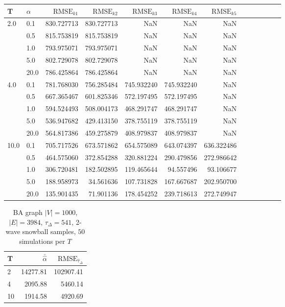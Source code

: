 \documentclass{article}
\begin{document}
\begin{table}[h]
\begin{tabular}{llrrrrrrrrrrr}
\toprule
  T   &  $\alpha$    &     $\text{RMSE}_{k1}$ &     $\text{RMSE}_{k2}$ &     $\text{RMSE}_{k3}$ &     $\text{RMSE}_{k4}$ &     $\text{RMSE}_{k5}$ \\
\midrule
2.0  & 0.1 &  830.727713 &  830.727713 &         NaN &         NaN &         NaN \\
     & 0.5 &  815.753819 &  815.753819 &         NaN &         NaN &         NaN \\
     & 1.0  &  793.975071 &  793.975071 &         NaN &         NaN &         NaN \\
     & 5.0 &  802.729078 &  802.729078 &         NaN &         NaN &         NaN \\
     & 20.0 &  786.425864 &  786.425864 &         NaN &         NaN &         NaN \\
4.0  & 0.1  &  781.768030 &  756.285484 &  745.932240 &  745.932240 &         NaN \\
     & 0.5  &  667.365467 &  601.825346 &  572.197495 &  572.197495 &         NaN \\
     & 1.0  &  594.524493 &  508.004173 &  468.291747 &  468.291747 &         NaN \\
     & 5.0  &  536.947682 &  429.413150 &  378.755119 &  378.755119 &         NaN \\
     & 20.0 &  564.817386 &  459.275879 &  408.979837 &  408.979837 &         NaN \\
10.0 & 0.1  &  705.717526 &  673.571862 &  654.575089 &  643.074397 &  636.322486 \\
     & 0.5  &  464.575060 &  372.854288 &  320.881224 &  290.479856 &  272.986642 \\
     & 1.0  &  306.720481 &  182.502895 &  119.465644 &   94.557496 &   93.106677 \\
     & 5.0  &  188.958973 &   34.561636 &  107.731828 &  167.667687 &  202.950700 \\
     & 20.0  &  135.901435 &   71.901136 &  178.454252 &  239.718613 &  272.749947 \\
\bottomrule
\end{tabular}
\end{table}

\begin{table}[h]
\caption {BA graph $|V| = 1000$, $|E| = 3984$, $\tau_{\Delta} = 541$, 2-wave snowball samples, $50$ simulations per $T$}
\begin{center}
\begin{tabular}{lrr}
\toprule
T &  $\bar{\hat{\alpha}}$ & $\text{RMSE}_{\hat{\tau}_{\Delta}}$ \\
\midrule
2  &          14277.81 &  102907.41 \\
4  &           2095.88 &    5460.14 \\
10 &           1914.58 &    4920.69 \\
\bottomrule
\end{tabular}
\end{center}
\end{table}
\end{document}

